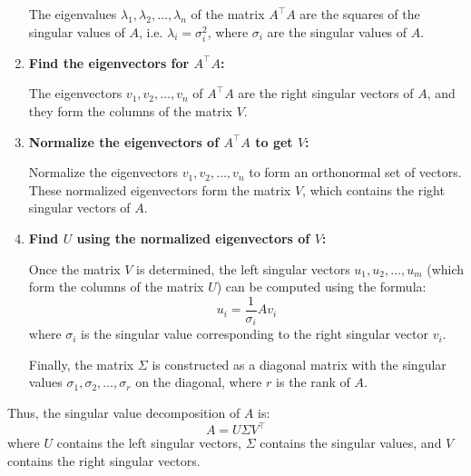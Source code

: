 \begin{process}
\begin{enumerate}
        The eigenvalues \( \lambda_1, \lambda_2, \dots, \lambda_n \) of the matrix \( A^\top A \) are the squares of the singular values of \( A \), i.e. \( \lambda_i = \sigma_i^2 \), where \( \sigma_i \) are the singular values of \( A \).

        \item \textbf{Find the eigenvectors for \( A^\top A \):}
        
        The eigenvectors \( v_1, v_2, \dots, v_n \) of \( A^\top A \) are the right singular vectors of \( A \), and they form the columns of the matrix \( V \).

        \item \textbf{Normalize the eigenvectors of \( A^\top A \) to get \( V \):}
        
        Normalize the eigenvectors \( v_1, v_2, \dots, v_n \) to form an orthonormal set of vectors. These normalized eigenvectors form the matrix \( V \), which contains the right singular vectors of \( A \).

        \item \textbf{Find \( U \) using the normalized eigenvectors of \( V \):}
        
        Once the matrix \( V \) is determined, the left singular vectors \( u_1, u_2, \dots, u_m \) (which form the columns of the matrix \( U \)) can be computed using the formula:
        \[
        u_i = \frac{1}{\sigma_i} A v_i
        \]
        where \( \sigma_i \) is the singular value corresponding to the right singular vector \( v_i \).

        Finally, the matrix \( \Sigma \) is constructed as a diagonal matrix with the singular values \( \sigma_1, \sigma_2, \dots, \sigma_r \) on the diagonal, where \( r \) is the rank of \( A \).
        
    \end{enumerate}

    Thus, the singular value decomposition of \( A \) is:
    \[
    A = U \Sigma V^\top
    \]
    where \( U \) contains the left singular vectors, \( \Sigma \) contains the singular values, and \( V \) contains the right singular vectors.
\end{process}

